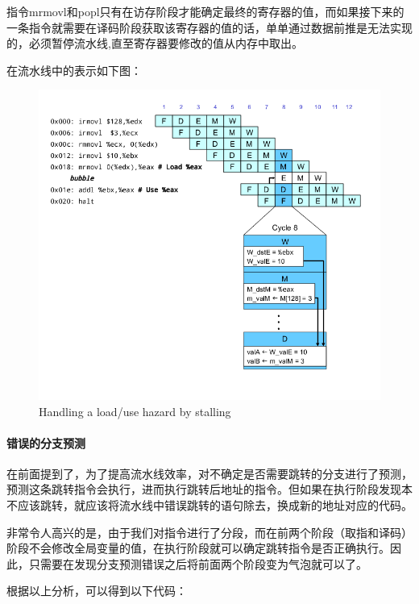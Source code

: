指令mrmovl和popl只有在访存阶段才能确定最终的寄存器的值，而如果接下来的一条指令就需要在译码阶段获取该寄存器的值的话，单单通过数据前推是无法实现的，必须暂停流水线,直至寄存器要修改的值从内存中取出。

在流水线中的表示如下图：

\begin{figure}[htbp]
\centering
\includegraphics{img/prog5-stall.png}
\caption{Handling a load/use hazard by stalling}
\end{figure}

\paragraph{错误的分支预测}\label{ux9519ux8befux7684ux5206ux652fux9884ux6d4b}

在前面提到了，为了提高流水线效率，对不确定是否需要跳转的分支进行了预测，预测这条跳转指令会执行，进而执行跳转后地址的指令。但如果在执行阶段发现本不应该跳转，就应该将流水线中错误跳转的语句除去，换成新的地址对应的代码。

非常令人高兴的是，由于我们对指令进行了分段，而在前两个阶段（取指和译码）阶段不会修改全局变量的值，在执行阶段就可以确定跳转指令是否正确执行。因此，只需要在发现分支预测错误之后将前面两个阶段变为气泡就可以了。

根据以上分析，可以得到以下代码：

